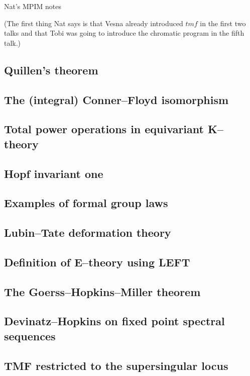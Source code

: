Nat's MPIM notes

(The first thing Nat says is that Vesna already introduced $tmf$ in the first two talks and that Tobi was going to introduce the chromatic program in the fifth talk.)

    \subsection*{Quillen's theorem}
    \subsection*{The (integral) Conner--Floyd isomorphism}
    \subsection*{Total power operations in equivariant K--theory}
    \subsection*{Hopf invariant one}

    \subsection*{Examples of formal group laws}
    \subsection*{Lubin--Tate deformation theory}
    \subsection*{Definition of E--theory using LEFT}

    \subsection*{The Goerss--Hopkins--Miller theorem}
    \subsection*{Devinatz--Hopkins on fixed point spectral sequences}
    \subsection*{TMF restricted to the supersingular locus}
